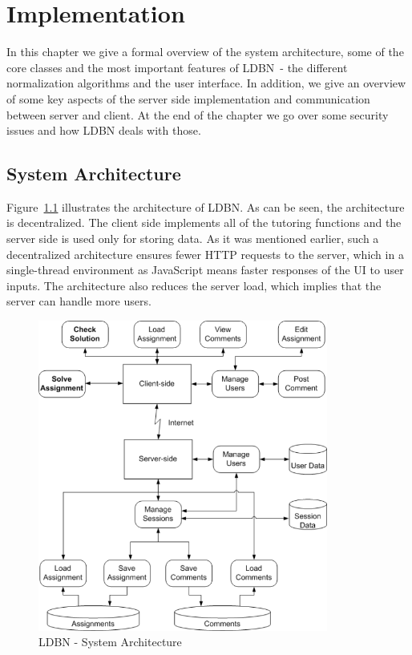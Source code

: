 \chapter{Implementation}
\label{chap:impl}
In this chapter we give a formal overview of the system architecture,
some of the core classes and the most important
features of LDBN~- the different normalization algorithms and the user interface. 
In addition, we give an overview
of some key aspects of the server side implementation and communication
between server and client. At the end of the chapter we go over some
security issues and how LDBN deals with those. 

\section{System Architecture}
Figure~\ref{fig:sysarch} illustrates the architecture of LDBN. 
As can be seen, the architecture is decentralized. The client side implements 
all of the tutoring functions and the server side is used only for storing data.
As it was mentioned earlier, such a decentralized architecture ensures fewer HTTP requests to
the server, which in a single-thread environment as JavaScript means faster 
responses of the UI to user inputs. The architecture also reduces the server load,
which implies that the server can handle more users.

\begin{figure}[h]
	\begin{center}
		\includegraphics[width=0.85\textwidth]{./img/architecture01a.png}
		\caption{LDBN - System Architecture}
		\label{fig:sysarch}
	\end{center}
\end{figure}

